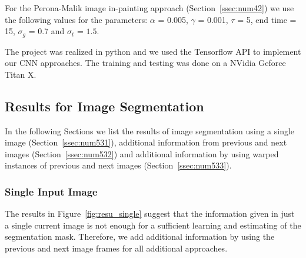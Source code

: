 For the Perona-Malik image in-painting approach (Section~\ref{ssec:num42}) we use the following values for the parameters:
$\alpha$ = 0.005, $\gamma$ = 0.001, $\tau$ = 5, end time = 15, $\sigma_g$ = 0.7 and $\sigma_t$ = $1.5$.

The project was realized in python and we used the Tensorflow API to implement our CNN approaches. The training and testing was done on a NVidia Geforce Titan X.
			

\subsection{Results for Image Segmentation}
\label{ssec:num53}

In the following Sections we list the results of image segmentation using a single image (Section~\ref{ssec:num531}), additional information from previous and next images (Section~\ref{ssec:num532}) and additional information by using warped instances of previous and next images (Section~\ref{ssec:num533}).
\subsubsection{Single Input Image}

The results in Figure~\ref{fig:resu_single} suggest that the information given in just a single current image is not enough for a sufficient learning and estimating of the segmentation mask.
Therefore, we add additional information by using the previous and next image frames for all additional approaches.

